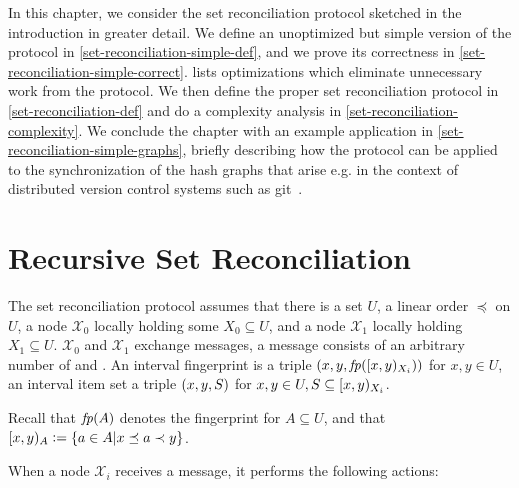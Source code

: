 
In this chapter, we consider the set reconciliation protocol sketched in the introduction in greater detail.
We define an unoptimized but simple version of the protocol in \cref{set-reconciliation-simple-def}, and we prove its correctness in \cref{set-reconciliation-simple-correct}.  lists optimizations which eliminate unnecessary work from the protocol. We then define the proper set reconciliation protocol in \cref{set-reconciliation-def} and  do a complexity analysis in \cref{set-reconciliation-complexity}. We conclude the chapter with an example application in \cref{set-reconciliation-simple-graphs}, briefly describing how the protocol can be applied to the synchronization of the hash graphs that arise e.g. in the context of distributed version control systems such as git~\cite{chacon2014pro}.

\section{Recursive Set Reconciliation}

The set reconciliation protocol assumes that there is a set $U$, a linear order $\preceq$ on $U$, a node $\mathcal{X}_0$ locally holding some $X_0 \subseteq U$, and a node $\mathcal{X}_1$ locally holding $X_1 \subseteq U$.
$\mathcal{X}_0$ and $\mathcal{X}_1$ exchange messages, a message consists of an arbitrary number of  and .
An interval fingerprint is a triple $({x}, {y}, {\mathit{fp}([{x},{y})_{X_i})})$ for $x, y \in U$, an interval item set a triple $({x}, {y}, {S})$ for $x, y \in U, S \subseteq [{x},{y})_{X_i}$.

Recall that $\mathit{fp}(A)$ denotes the fingerprint for $A \subseteq U$, and that $[{x},{y})_{A} \vcentcolon= \{a \in A | x \preceq a \prec y\}$.

When a node $\mathcal{X}_i$ receives a message, it performs the following actions:

